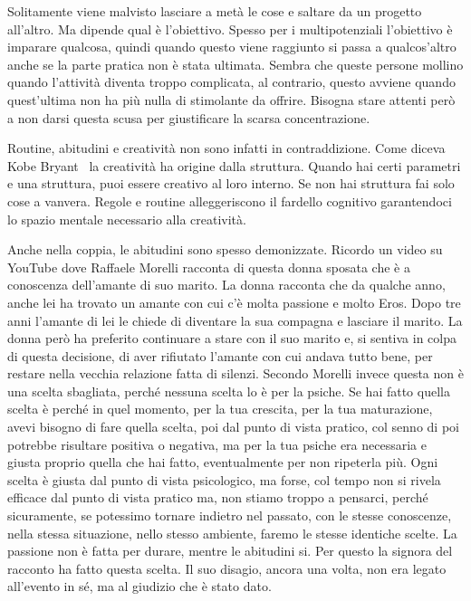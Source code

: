 \documentclass[12pt]{book} %
\begin{document}
\begin{mdframed}[linewidth=1pt]
Solitamente viene malvisto lasciare a metà le cose e saltare da un progetto all'altro. Ma dipende
qual è l'obiettivo. Spesso per i multipotenziali l'obiettivo è imparare
qualcosa, quindi quando questo viene raggiunto si passa a qualcos'altro anche se la parte pratica
non è stata ultimata. Sembra che queste persone mollino quando l'attività diventa troppo
complicata, al contrario, questo avviene quando quest'ultima non ha più nulla di stimolante da
offrire. Bisogna stare attenti però a non darsi questa scusa per giustificare la scarsa concentrazione.

Routine, abitudini e creatività non sono infatti in contraddizione. Come diceva Kobe Bryant \ la creatività ha origine
dalla struttura. Quando hai certi parametri e una struttura, puoi essere creativo al loro interno. Se non hai struttura
fai solo cose a vanvera. Regole e routine alleggeriscono il fardello cognitivo garantendoci lo spazio mentale
necessario alla creatività.

Anche nella coppia, le abitudini sono spesso demonizzate. Ricordo un video su YouTube dove Raffaele Morelli racconta di
questa donna sposata che è a conoscenza dell'amante di suo marito. La donna racconta che da
qualche anno, anche lei ha trovato un amante con cui c'è molta passione e molto Eros. Dopo tre anni l'amante di lei le
chiede di diventare la sua compagna e lasciare il marito. La donna però ha preferito continuare a stare con il suo
marito e, si sentiva in colpa di questa decisione, di aver rifiutato l'amante con cui andava tutto
bene, per restare nella vecchia relazione fatta di silenzi. Secondo Morelli invece questa non è una scelta sbagliata,
perché nessuna scelta lo è per la psiche. Se hai fatto quella scelta è perché in quel momento, per la tua crescita, per
la tua maturazione, avevi bisogno di fare quella scelta, poi dal punto di vista pratico, col senno di poi potrebbe
risultare positiva o negativa, ma per la tua psiche era necessaria e giusta proprio quella che hai fatto, eventualmente
per non ripeterla più. Ogni scelta è giusta dal punto di vista psicologico, ma forse, col tempo non si rivela efficace
dal punto di vista pratico ma, non stiamo troppo a pensarci, perché sicuramente, se potessimo tornare indietro nel
passato, con le stesse conoscenze, nella stessa situazione, nello stesso ambiente, faremo le stesse identiche scelte.
La passione non è fatta per durare, mentre le abitudini si. Per questo la signora del racconto ha fatto questa scelta.
Il suo disagio, ancora una volta, non era legato all'evento in sé, ma al giudizio che è stato
dato.


\end{mdframed}
\end{document}
